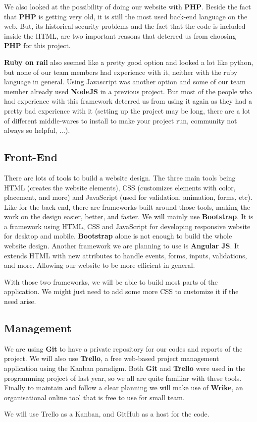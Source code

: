 We also looked at the possibility of doing our website with \textbf{PHP}.
Beside the fact that \textbf{PHP} is getting very old, it is still the most
used back-end language on the web. But, its historical security problems
and the fact that the code is included inside the HTML, are two important
reasons that deterred us from choosing \textbf{PHP} for this
project.\newline

\textbf{Ruby on rail} also seemed like a pretty good option and looked a
lot like python, but none of our team members had experience with it,
neither with the ruby language in general. Using Javascript was another
option and some of our team member already used \textbf{NodeJS} in a
previous project. But most of the people who had experience with this
framework deterred us from using it again as they had a pretty bad
experience with it (setting up the project may be long, there are a lot of
different middle-wares to install to make your project run, community not
always so helpful, ...).

\subsection{Front-End}

There are lots of tools to build a website design. The three main tools
being HTML (creates the website elements), CSS (customizes elements with
color, placement, and more) and JavaScript (used for validation, animation,
forms, etc). Like for the back-end, there are frameworks built around those
tools, making the work on the design easier, better, and faster. We will
mainly use \textbf{Bootstrap}. It is a framework using HTML, CSS and
JavaScript for developing responsive website for desktop and mobile.
\textbf{Bootstrap} alone is not enough to build the whole website design.
Another framework we are planning to use is \textbf{Angular JS}. It extends
HTML with new attributes to handle events, forms, inputs, validations, and
more. Allowing our website to be more efficient in general. \newline

With those two frameworks, we will be able to build most parts of the
application. We might just need to add some more CSS to customize it if the
need arise.

\subsection{Management}

We are using \textbf{Git} to have a private repository for our codes and
reports of the project. We will also use \textbf{Trello}, a free web-based
project management application using the Kanban paradigm. Both \textbf{Git}
and \textbf{Trello} were used in the programming project of last year, so
we all are quite familiar with these tools. Finally to maintain and follow a clear planning we will make use of \textbf{Wrike}, an organisational online tool that is free to use for small team.\newline

We will use Trello as a Kanban, and GitHub as a host for the code. \newline